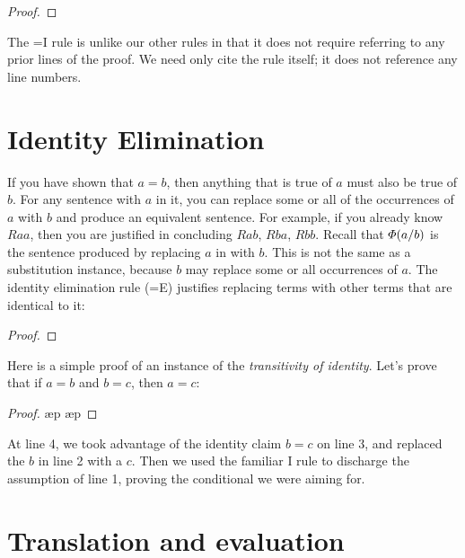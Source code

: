 \begin{proof}
	 
\end{proof}

The {=}I rule is unlike our other rules in that it does not require referring to any prior lines of the proof. We need only cite the rule itself; it does not reference any line numbers.

\section{Identity Elimination}

If you have shown that $a{=}b$, then anything that is true of $a$ must also be true of $b$. For any sentence with $a$ in it, you can replace some or all of the occurrences of $a$ with $b$ and produce an equivalent sentence. For example, if you already know $Raa$, then you are justified in concluding $Rab$, $Rba$, $Rbb$. Recall that $\varPhi{}(a/b)$ is the sentence produced by replacing $a$ in \metaA{} with $b$. This is not the same as a substitution instance, because $b$ may replace some or all occurrences of $a$. The identity elimination rule ({=}E) justifies replacing terms with other terms that are identical to it:
\begin{proof}
	 
	 
\end{proof}

Here is a simple proof of an instance of the \emph{transitivity of identity}. Let's prove that if $a{=}b$ and $b{=}c$, then $a{=}c$:

\begin{proof}
	\open
		\ae{p}
		\ae{p}
	\close
	 
\end{proof}

At line 4, we took advantage of the identity claim $b{=}c$ on line 3, and replaced the $b$ in line 2 with a $c$. Then we used the familiar \eif{}I rule to discharge the assumption of line 1, proving the conditional we were aiming for.


\section{Translation and evaluation}

